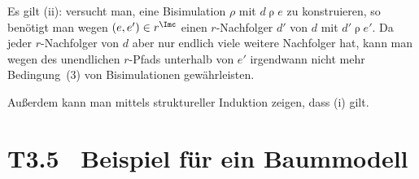 \documentclass[fontsize=11pt, twoside=false, numbers=autoenddot]{scrbook}
\begin{document}
\begin{beweis}
\begin{center}
\begin{tikzpicture}
    \end{tikzpicture}%
  \end{center}
  Es gilt (ii):
  versucht man, eine Bisimulation $\rho$ mit $d\mathbin{\rho}e$ zu konstruieren,
  so benötigt man wegen $(e,e') \in r^\Imc$ einen $r$-Nachfolger $d'$ von $d$
  mit $d' \mathbin{\rho} e'$.
  Da jeder $r$-Nachfolger von $d$ aber nur endlich viele weitere Nachfolger hat,
  kann man wegen des unendlichen $r$-Pfads unterhalb von $e'$
  irgendwann nicht mehr Bedingung~(3) von Bisimulationen gewährleisten.
  
  \parII
  Außerdem kann man mittels struktureller Induktion zeigen, dass (i) gilt.
  \qedhere
\end{beweis}

\section*{T3.5~ Beispiel für ein Baummodell}
\end{document}

